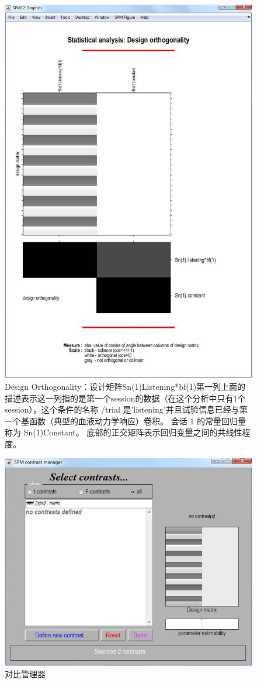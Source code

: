 \begin{figure}[htbp]
	\centering
	\includegraphics[width=0.6\linewidth]{part7/figs/fig_30_10}
	\caption{Design Orthogonality：设计矩阵Sn(1)Listening*bf(1)第一列上面的描述表示这一列指的是第一个session的数据（在这个分析中只有1个session），这个条件的名称 /trial 是'listening'并且试验信息已经与第一个基函数（典型的血液动力学响应）卷积。 会话 1 的常量回归量称为 Sn(1)Constant。 底部的正交矩阵表示回归变量之间的共线性程度。}
	\label{fig_30_10}
\end{figure}


\begin{figure}[htbp]
	\centering
	\includegraphics[width=0.6\linewidth]{part7/figs/fig_30_11}
	\caption{对比管理器}
	\label{fig_30_11}
\end{figure}

